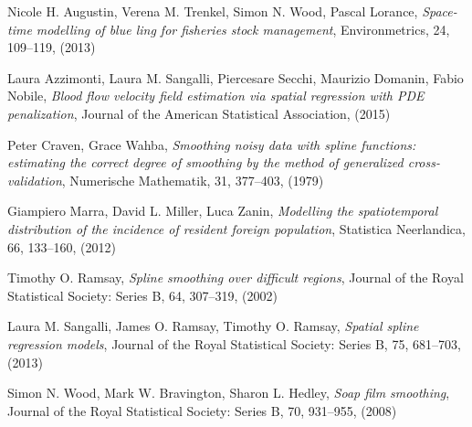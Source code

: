 \documentclass[a4paper,11pt,twoside,openright]{book}							%
\begin{document}
\begin{thebibliography}{9}

Nicole H. Augustin, Verena M. Trenkel, Simon N. Wood, Pascal Lorance, \emph{Space-time modelling of blue ling for fisheries stock management}, Environmetrics, 24, 109–119, (2013)

Laura Azzimonti, Laura M. Sangalli, Piercesare Secchi, Maurizio Domanin, Fabio Nobile, \emph{Blood flow velocity field estimation via spatial regression with PDE penalization}, Journal of the American Statistical Association, (2015)

Peter Craven, Grace Wahba, \emph{Smoothing noisy data with spline functions: estimating the correct degree of smoothing by the method of generalized cross-validation}, Numerische Mathematik, 31, 377–403, (1979)

Giampiero Marra, David L. Miller, Luca Zanin, \emph{Modelling the spatiotemporal distribution of the incidence of resident foreign population}, Statistica Neerlandica, 66, 133–160, (2012)

Timothy O. Ramsay, \emph{Spline smoothing over difficult regions}, Journal of the Royal Statistical Society: Series B, 64, 307–319, (2002)

Laura M. Sangalli, James O. Ramsay, Timothy O. Ramsay, \emph{Spatial spline regression models}, Journal of the Royal Statistical Society: Series B, 75, 681–703, (2013)

Simon N. Wood, Mark W. Bravington, Sharon L. Hedley, \emph{Soap film smoothing}, Journal of the Royal Statistical Society: Series B, 70, 931–955, (2008)



\end{thebibliography}
\end{document}
